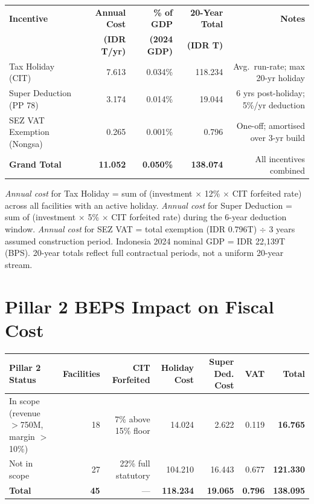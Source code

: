 \documentclass[a4paper,10pt]{article}
\begin{document}
\small
\begin{tabular}{lrrrr}
  \toprule
  \textbf{Incentive} &
  \textbf{Annual Cost} &
  \textbf{\% of GDP} &
  \textbf{20-Year Total} &
  \textbf{Notes} \\
  & \textbf{(IDR T/yr)} & \textbf{(2024 GDP)} & \textbf{(IDR T)} & \\
  \midrule
  Tax Holiday (CIT)          & 7.613 & 0.034\% & 118.234 & Avg.\ run-rate; max 20-yr holiday \\
  Super Deduction (PP 78)    & 3.174 & 0.014\% &  19.044 & 6 yrs post-holiday; 5\%/yr deduction \\
  SEZ VAT Exemption (Nongsa) & 0.265 & 0.001\% &   0.796 & One-off; amortised over 3-yr build \\
  \midrule
  \rowcolor{lightgray}
  \textbf{Grand Total}       & \textbf{11.052} & \textbf{0.050\%} & \textbf{138.074} & All incentives combined \\
  \bottomrule
\end{tabular}

\vspace{4pt}
{\footnotesize\color{midgray}
  \textit{Annual cost} for Tax Holiday = sum of (investment $\times$ 12\% $\times$ CIT forfeited rate) across all facilities with an active holiday.
  \textit{Annual cost} for Super Deduction = sum of (investment $\times$ 5\% $\times$ CIT forfeited rate) during the 6-year deduction window.
  \textit{Annual cost} for SEZ VAT = total exemption (IDR 0.796T) $\div$ 3 years assumed construction period.
  Indonesia 2024 nominal GDP = IDR 22,139T (BPS). 20-year totals reflect full contractual periods, not a uniform 20-year stream.
}

\vspace{8pt}

\section{Pillar 2 BEPS Impact on Fiscal Cost}

\begin{tabular}{lrrrrrr}
  \toprule
  \textbf{Pillar 2 Status} & \textbf{Facilities} & \textbf{CIT Forfeited} & \textbf{Holiday Cost} & \textbf{Super Ded. Cost} & \textbf{VAT} & \textbf{Total} \\
  \midrule
  In scope (revenue $>$\texteuro{}750M, margin $>$10\%) & 18 & 7\% above 15\% floor  & 14.024 & 2.622 & 0.119 & \textbf{16.765} \\
  Not in scope                                    & 27 & 22\% full statutory    & 104.210 & 16.443 & 0.677 & \textbf{121.330} \\
  \midrule
  \rowcolor{lightgray}
  \textbf{Total}                                  & \textbf{45} & --- & \textbf{118.234} & \textbf{19.065} & \textbf{0.796} & \textbf{138.095} \\
  \bottomrule
\end{tabular}
\end{document}
